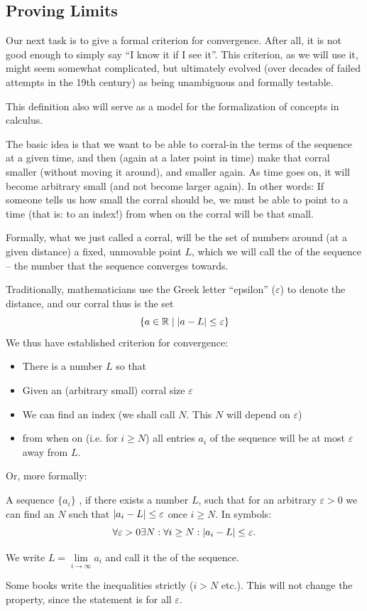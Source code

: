 \subsection{Proving Limits}

Our next task is to give a formal criterion for convergence. After all, it is not good
enough to simply say ``I know it if I see it''. This criterion, as we will use it, might
seem somewhat complicated, but ultimately evolved (over decades of failed attempts in the
19th century) as being unambiguous and formally testable. 

This definition also will serve as a model for the formalization of concepts in calculus.
\medskip

The basic idea is that we want to be able to corral-in the terms of the
sequence at a given time, and then (again at a
later point in time) make that corral smaller (without moving it around), and
smaller again.  As time goes on, it will become arbitrary small (and not
become larger again).  In other words: If someone tells us how small the
corral should be, we must be able to point to a time (that is: to an index!)
from when on the corral will be that small.

Formally, what we just called a corral, will be the set of numbers around (at a given
distance) a fixed,
unmovable point $L$, which we will call the  of the sequence -- the number
that the sequence converges towards.

Traditionally, mathematicians use the Greek letter ``epsilon'' ($\varepsilon$)
to denote the distance,
and our corral thus is the set
\[
\{a\in{\mathbb R}\mid \left|a-L\right|\le\varepsilon\}
\]
We thus have established criterion for convergence:
\begin{itemize}
\item There is a number $L$ so that
\item Given an (arbitrary small) corral size $\varepsilon$
\item We can find an index (we shall call $N$. This $N$ will depend on $\varepsilon$)
\item from when on (i.e. for $i\ge N$) all entries $a_i$ of the sequence will be
at most $\varepsilon$ away from $L$.
\end{itemize}
Or, more formally:
\begin{defn}
A sequence $\{a_i\}$ , if there exists a number $L$,
such that for an arbitrary $\varepsilon>0$ we can find
an $N$ such that $\left|a_i-L\right|\le\varepsilon$ once $i\ge N$. In symbols:
\[
\forall\varepsilon>0\exists N:\forall i\ge N: \left|a_i-L\right|\le\varepsilon.
\]

We write $L=\lim\limits_{i\to\infty} a_i$ and call it the
 of the sequence.
\end{defn}
\begin{note}
Some books write the inequalities strictly ($i>N$ etc.). This will not
change the property, since the statement is for all $\varepsilon$.
\end{note}

